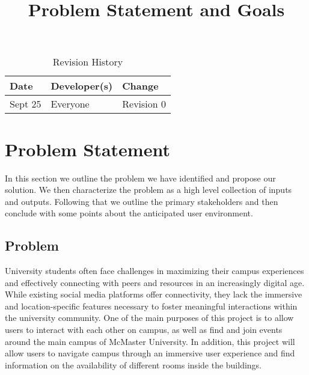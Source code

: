 \documentclass{article}
\title{Problem Statement and Goals\\\progname}
\author{\authname}
\date{}
\begin{document}
\maketitle

\begin{table}[hp]
\caption{Revision History} \label{TblRevisionHistory}
\begin{tabularx}{\textwidth}{llX}
\toprule
\textbf{Date} & \textbf{Developer(s)} & \textbf{Change}\\
\midrule
Sept 25 & Everyone & Revision 0\\
\bottomrule
\end{tabularx}
\end{table}

\section{Problem Statement}


In this section we outline the problem we have identified and propose our solution. We then characterize the problem as a high level collection of inputs and outputs. Following that we outline the primary stakeholders and then conclude with some points about the anticipated user environment.

\subsection{Problem}

\quad University students often face challenges in maximizing their campus experiences and effectively connecting with peers and resources in an increasingly digital age. While existing social media platforms offer connectivity, they lack the immersive and location-specific features necessary to foster meaningful interactions within the university community. One of the main purposes of this project is to allow users to interact with each other on campus, as well as find and join events around the main campus of McMaster University. In addition, this project will allow users to navigate campus through an immersive user experience and find information on the availability of different rooms inside the buildings.
\end{document}
